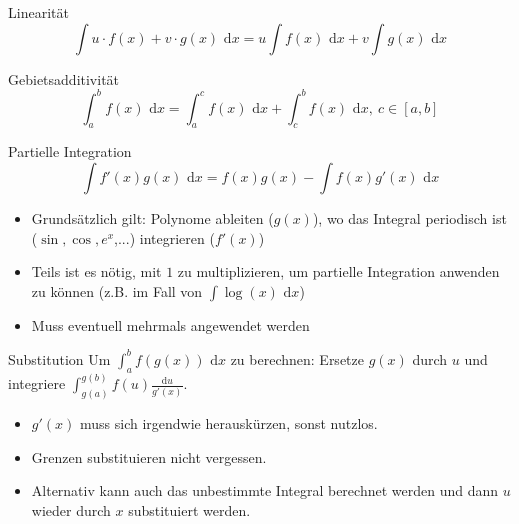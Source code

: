 \documentclass[a4paper,fontsize = 7pt]{scrartcl}
\def\dx{\text{ d}x}
\begin{document}
\begin{subbox}{Linearität}
 \vspace{-12pt}
 $$\int u\cdot f(x) + v \cdot g(x) \dx = u \int f(x) \dx + v \int g(x) \dx$$
 \vspace{-12pt}
\end{subbox}
\begin{subbox}{Gebietsadditivität}
 \vspace{-12pt}
 $$\int_a^b f(x) \dx = \int_a^c f(x) \dx + \int_c^b f(x) \dx, \ c \in [a,b]$$
 \vspace{-12pt}
\end{subbox}
\begin{mainbox}{Partielle Integration}
 \vspace{-12pt}
 $$\int f'(x) g(x) \dx = f(x)g(x) - \int f(x) g'(x) \dx$$
 \vspace{-12pt}
\end{mainbox}
\begin{itemize}
 \item Grundsätzlich gilt: Polynome ableiten ($g(x)$), wo das Integral periodisch ist ($\sin, \cos, e^x$,...) integrieren ($f'(x)$)
 \item Teils ist es nötig, mit $1$ zu multiplizieren, um partielle Integration anwenden zu können (z.B. im Fall von $\int \log(x) \dx$)
 \item Muss eventuell mehrmals angewendet werden
\end{itemize}
\begin{mainbox}{Substitution}
  \vspace{-12pt}
 Um $\int_a^b f(g(x)) \dx$ zu berechnen: Ersetze $g(x)$ durch $u$ und integriere $\int_{g(a)}^{g(b)} f(u) \frac{\text{d}u}{g'(x)}$.
 \vspace{-12pt}
\end{mainbox}
\begin{itemize}
 \item $g'(x)$ muss sich irgendwie herauskürzen, sonst nutzlos.
 \item Grenzen substituieren nicht vergessen.
 \item Alternativ kann auch das unbestimmte Integral berechnet werden und dann $u$ wieder durch $x$ substituiert werden.
\end{itemize}
\end{document}
